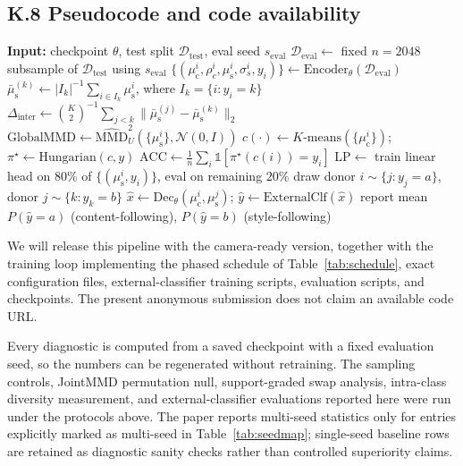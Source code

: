 \documentclass[letterpaper]{article}
\newcommand{\muc}{\mu_{\mathrm{c}}}
\newcommand{\mus}{\mu_{\mathrm{s}}}
\newcommand{\MMD}{\mathrm{MMD}}
\newcommand{\Dinter}{\Delta_{\mathrm{inter}}}
\begin{document}
\subsection{K.8 Pseudocode and code availability}

\begin{algorithm}[h]
\caption{Leakage diagnostic pipeline (evaluation-only, from a saved checkpoint)}
\begin{algorithmic}[1]
\State \textbf{Input:} checkpoint $\theta$, test split $\mathcal D_{\mathrm{test}}$, eval seed $s_{\mathrm{eval}}$
\State $\mathcal D_{\mathrm{eval}}\gets$ fixed $n{=}2048$ subsample of $\mathcal D_{\mathrm{test}}$ using $s_{\mathrm{eval}}$
\State $\{(\muc^i,\rho_c^i,\mus^i,\sigma_s^i,y_i)\}\gets \mathrm{Encoder}_\theta(\mathcal D_{\mathrm{eval}})$
  \State $\bar\mus^{(k)}\gets |I_k|^{-1}\sum_{i\in I_k}\mus^i$, where $I_k=\{i:y_i=k\}$
\EndFor
\State $\Dinter\gets\binom{K}{2}^{-1}\sum_{j<k}\|\bar\mus^{(j)}-\bar\mus^{(k)}\|_2$ 
\State $\mathrm{GlobalMMD}\gets\widehat{\MMD}^2_U(\{\mus^i\},\mathcal N(0,I))$
\State $c(\cdot)\gets K\text{-means}(\{\muc^i\})$; $\pi^\star\gets\mathrm{Hungarian}(c,y)$ 
\State $\mathrm{ACC}\gets \frac1n\sum_i\mathbb 1[\pi^\star(c(i)){=}y_i]$
\State $\mathrm{LP}\gets$ train linear head on $80\%$ of $\{(\mus^i,y_i)\}$, eval on remaining $20\%$
    \State draw donor $i\sim\{j:y_j{=}a\}$, donor $j\sim\{k:y_k{=}b\}$
    \State $\hat x\gets \mathrm{Dec}_\theta(\muc^i,\mus^j)$; $\hat y\gets \mathrm{ExternalClf}(\hat x)$ 
  \EndFor
\EndFor
\State report mean $P(\hat y{=}a)$ (content-following), $P(\hat y{=}b)$ (style-following)
\end{algorithmic}
\end{algorithm}

We will release this pipeline with the camera-ready version, together with
the training loop implementing the phased schedule of
Table~\ref{tab:schedule}, exact configuration files, external-classifier
training scripts, evaluation scripts, and checkpoints. The present anonymous
submission does not claim an available code URL.

Every diagnostic is computed from a saved checkpoint with a fixed evaluation
seed, so the numbers can be regenerated without retraining. The sampling
controls, JointMMD permutation null, support-graded swap analysis,
intra-class diversity measurement, and external-classifier evaluations
reported here were run under the protocols above. The paper reports
multi-seed statistics only for entries explicitly marked as multi-seed in
Table~\ref{tab:seedmap}; single-seed baseline rows are retained as diagnostic
sanity checks rather than controlled superiority claims.
\end{document}
